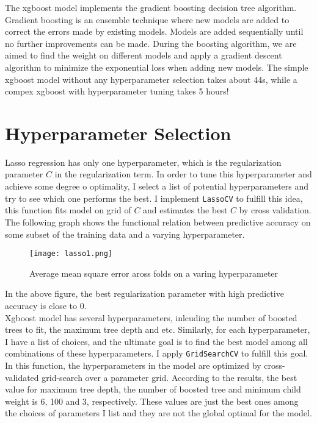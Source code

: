 \documentclass[12pt]{article}
\begin{document}
The xgboost model implements the gradient boosting decision tree algorithm. Gradient boosting is an ensemble technique where new models are added to correct the errors made by existing models. Models are added sequentially until no further improvements can be made.  During the boosting algorithm, we are aimed to find the weight on different models and apply a gradient descent algorithm to minimize the exponential loss when adding new models. The  simple xgboost model without any hyperparameter selection takes about 44s, while a compex xgboost with hyperparameter tuning takes 5 hours!


\section{Hyperparameter Selection}

Lasso regression has only one hyperparameter, which is the regularization parameter $C$ in the regularization term.  In order to tune this hyperparameter and achieve some degree o optimality, I select a list of potential hyperparameters and try to see which one performs the best. I implement \texttt{LassoCV} to fulfill this idea, this function fits model on grid of $C$ and estimates the best $C$ by cross validation. The following  graph shows the functional relation between predictive accuracy on some subset of the training data and a varying hyperparameter. \\

 \begin{figure}[htbp]
\begin{center}
\texttt{[image: lasso1.png]}
\caption{Average mean square error aross folds on a varing hyperparameter}
\end{center}
\end{figure}


In the above figure, the best regularization parameter with high predictive accuracy is close to 0. \\

Xgboost model has several hyperparameters, inlcuding the number of boosted trees to fit, the maximum tree depth and etc. Similarly, for each hyperparameter, I have a list of choices, and the ultimate goal is to find the best model among all combinations of these hyperparameters. I apply \texttt{GridSearchCV} to fulfill this goal. In this function, the hyperparameters in the model are optimized by cross-validated grid-search over a parameter grid.  According to the results, the best value for maximum tree depth, the number of boosted tree and minimum child weight is 6, 100 and 3, respectively.  These values are just the best ones among the choices of parameters I list and they are not the global optimal for the model.
\end{document}
